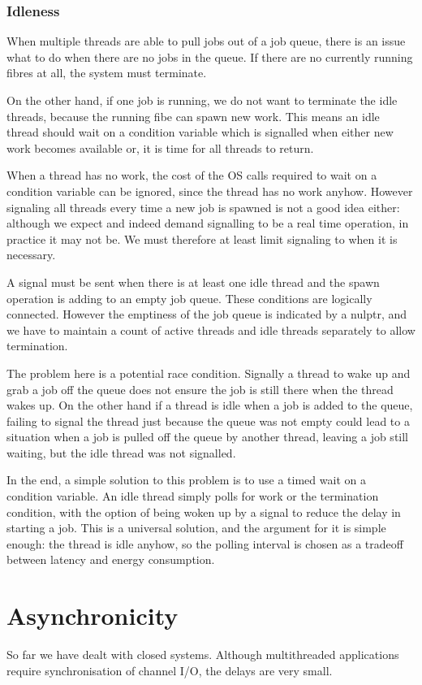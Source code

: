 \documentclass[oneside]{book}
\begin{document}
\subsubsection{Idleness}
When multiple threads are able to pull jobs out of a job queue,
there is an issue what to do when there are no jobs in the queue.
If there are no currently running fibres at all, the system must
terminate.

On the other hand, if one job is running, we do not want to terminate
the idle threads, because the running fibe can spawn new work.
This means an idle thread should wait on a condition variable which
is signalled when either new work becomes available or, it is time
for all threads to return.

When a thread has no work, the cost of the OS calls required to
wait on a condition variable can be ignored, since the thread
has no work anyhow. However signaling all threads every time
a new job is spawned is not a good idea either: although we expect
and indeed demand signalling to be a real time operation, in practice
it may not be. We must therefore at least limit signaling to when it
is necessary.

A signal must be sent when there is at least one idle thread and the 
spawn operation is adding to an empty job queue. These conditions
are logically connected. However the emptiness of the job queue
is indicated by a nulptr, and we have to maintain a count of 
active threads and idle threads separately to allow termination.

The problem here is a potential race condition. Signally a thread
to wake up and grab a job off the queue does not ensure the job
is still there when the thread wakes up. On the other hand if
a thread is idle when a job is added to the queue, failing to
signal the thread just because the queue was not empty could
lead to a situation when a job is pulled off the queue by another
thread, leaving a job still waiting, but the idle thread was
not signalled.

In the end, a simple solution to this problem is to use a timed wait
on a condition variable. An idle thread simply polls for work or the
termination condition, with the option of being woken up by a signal
to reduce the delay in starting a job. This is a universal solution,
and the argument for it is simple enough: the thread is idle anyhow,
so the polling interval is chosen as a tradeoff between latency and
energy consumption.

\section{Asynchronicity}
So far we have dealt with closed systems. Although multithreaded
applications require synchronisation of channel I/O, the delays
are very small.
\end{document}
